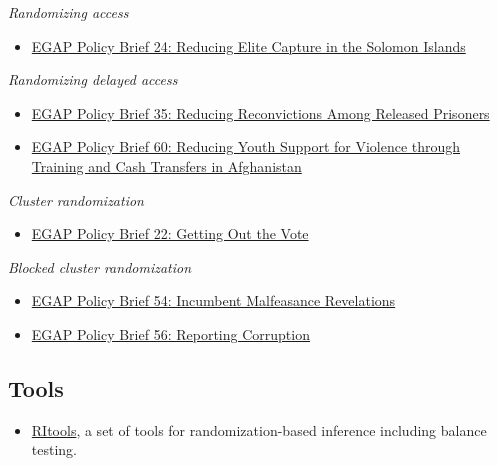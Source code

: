 \documentclass[12pt,]{book}
\providecommand{\tightlist}{%
  \setlength{\itemsep}{0pt}\setlength{\parskip}{0pt}}
\begin{document}
\emph{Randomizing access}

\begin{itemize}
\tightlist
\item
  \href{https://egap.org/resource/brief-24-reducing-elite-capture-in-the-solomon-islands/}{EGAP Policy Brief 24: Reducing Elite Capture in the Solomon Islands}
\end{itemize}

\emph{Randomizing delayed access}

\begin{itemize}
\item
  \href{https://egap.org/resource/brief-35-reducing-reconvictions-among-released-prisoners/}{EGAP Policy Brief 35: Reducing Reconvictions Among Released Prisoners}
\item
  \href{https://egap.org/resource/reducing-youth-support-for-violence-through-training-and-cash-transfers-in-afghanistan/}{EGAP Policy Brief 60: Reducing Youth Support for Violence through Training and Cash Transfers in Afghanistan}
\end{itemize}

\emph{Cluster randomization}

\begin{itemize}
\tightlist
\item
  \href{https://egap.org/resource/brief-22-getting-out-the-vote/}{EGAP Policy Brief 22: Getting Out the Vote}
\end{itemize}

\emph{Blocked cluster randomization}

\begin{itemize}
\item
  \href{https://egap.org/resource/evidence-from-mexico-the-effect-of-incumbent-malfeasance-revelations/}{EGAP Policy Brief 54: Incumbent Malfeasance Revelations}
\item
  \href{https://egap.org/resource/reporting-corruption-in-nigeria-testing-the-effects-of-norms-nudges/}{EGAP Policy Brief 56: Reporting Corruption}
\end{itemize}

\hypertarget{tools-1}{%
\subsection{Tools}\label{tools-1}}

\begin{itemize}
\tightlist
\item
  \href{https://cran.r-project.org/web/packages/RItools/index.html}{RItools}, a set of tools for randomization-based inference including balance testing.
\end{itemize}
\end{document}

